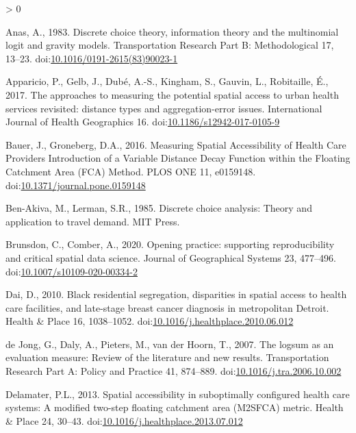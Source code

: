 \documentclass[]{elsarticle} %
\newlength{\cslhangindent}
\newenvironment{CSLReferences}[2] %
 {%
  \setlength{\parindent}{0pt}
  \ifodd #1 \everypar{\setlength{\hangindent}{\cslhangindent}}\ignorespaces\fi
  \ifnum #2 > 0
  \setlength{\parskip}{#2\baselineskip}
  \fi
 }%
 {}
\begin{document}
\hypertarget{refs}{}
\begin{CSLReferences}{1}{0}
\leavevmode\hypertarget{ref-anas1983}{}%
Anas, A., 1983. Discrete choice theory, information theory and the
multinomial logit and gravity models. Transportation Research Part B:
Methodological 17, 13--23.
doi:\href{https://doi.org/10.1016/0191-2615(83)90023-1}{10.1016/0191-2615(83)90023-1}

\leavevmode\hypertarget{ref-apparicio2017}{}%
Apparicio, P., Gelb, J., Dubé, A.-S., Kingham, S., Gauvin, L.,
Robitaille, É., 2017. The approaches to measuring the potential spatial
access to urban health services revisited: distance types and
aggregation-error issues. International Journal of Health Geographics
16.
doi:\href{https://doi.org/10.1186/s12942-017-0105-9}{10.1186/s12942-017-0105-9}

\leavevmode\hypertarget{ref-bauer2016}{}%
Bauer, J., Groneberg, D.A., 2016. Measuring Spatial Accessibility of
Health Care Providers {{}} Introduction of a Variable Distance Decay
Function within the Floating Catchment Area (FCA) Method. PLOS ONE 11,
e0159148.
doi:\href{https://doi.org/10.1371/journal.pone.0159148}{10.1371/journal.pone.0159148}

\leavevmode\hypertarget{ref-ben1985}{}%
Ben-Akiva, M., Lerman, S.R., 1985. Discrete choice analysis: Theory and
application to travel demand. MIT Press.

\leavevmode\hypertarget{ref-brunsdon2020}{}%
Brunsdon, C., Comber, A., 2020. Opening practice: supporting
reproducibility and critical spatial data science. Journal of
Geographical Systems 23, 477--496.
doi:\href{https://doi.org/10.1007/s10109-020-00334-2}{10.1007/s10109-020-00334-2}

\leavevmode\hypertarget{ref-dai2010}{}%
Dai, D., 2010. Black residential segregation, disparities in spatial
access to health care facilities, and late-stage breast cancer diagnosis
in metropolitan Detroit. Health \& Place 16, 1038--1052.
doi:\href{https://doi.org/10.1016/j.healthplace.2010.06.012}{10.1016/j.healthplace.2010.06.012}

\leavevmode\hypertarget{ref-dejong2007}{}%
de Jong, G., Daly, A., Pieters, M., van der Hoorn, T., 2007. The logsum
as an evaluation measure: Review of the literature and new results.
Transportation Research Part A: Policy and Practice 41, 874--889.
doi:\href{https://doi.org/10.1016/j.tra.2006.10.002}{10.1016/j.tra.2006.10.002}

\leavevmode\hypertarget{ref-delamater2013}{}%
Delamater, P.L., 2013. Spatial accessibility in suboptimally configured
health care systems: A modified two-step floating catchment area
(M2SFCA) metric. Health \& Place 24, 30--43.
doi:\href{https://doi.org/10.1016/j.healthplace.2013.07.012}{10.1016/j.healthplace.2013.07.012}


\end{CSLReferences}
\end{document}
